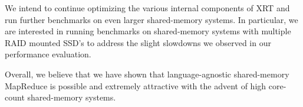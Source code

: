 \documentclass[twocolumn,11px]{article}       %
\begin{document}
We intend to continue optimizing the various internal components of XRT and run further benchmarks on even larger shared-memory systems.
In particular, we are interested in running benchmarks on shared-memory systems with multiple RAID mounted SSD's to address the slight slowdowns we observed in our performance evaluation.

Overall, we believe that we have shown that language-agnostic shared-memory MapReduce is possible and extremely attractive with the advent of high core-count shared-memory systems.



\end{document}
